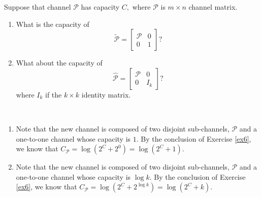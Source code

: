 \begin{exercise}[Capacity]{Suppose that channel $\mathcal{P}$ has capacity $C,$ where $\mathcal{P}$ is $m \times n$ channel matrix.
  \begin{enumerate}
    \item What is the capacity of
    $$
    \tilde{\mathcal{P}}=\left[\begin{array}{ll}
    \mathcal{P} & 0 \\
    0 & 1
    \end{array}\right] ?
    $$
    \item  What about the capacity of
    $$
    \hat{\mathcal{P}}=\left[\begin{array}{cc}
    \mathcal{P} & 0 \\
    0 & I_{k}
    \end{array}\right] ?
    $$
    where $I_{k}$ if the $k \times k$ identity matrix.
  \end{enumerate} }
  \begin{solution}
  \par{~}
  \begin{enumerate}
    \item { Note that the new channel is composed of two disjoint sub-channels, $\mathcal{P}$ and a one-to-one channel whose capacity is $1$. By the conclusion of Exercise \ref{ex6}, we know that $C_{\mathcal{P}} = \log (2^{C} + 2^{0}) = \log (2^{C} + 1)$. }
    \item { Note that the new channel is composed of two disjoint sub-channels, $\mathcal{P}$ and a one-to-one channel whose capacity is $\log k$. By the conclusion of Exercise \ref{ex6}, we know that $C_{\mathcal{P}} = \log (2^{C} + 2^{\log k}) = \log (2^{C} + k)$. }
  \end{enumerate}
  \end{solution}
  \label{ex7}
\end{exercise}

